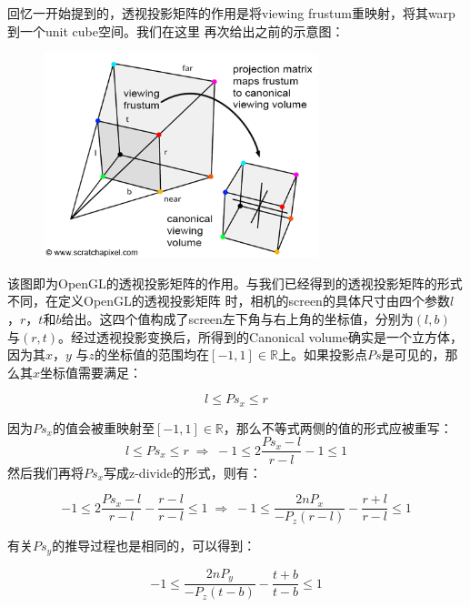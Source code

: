 \documentclass[12pt]{article}
\begin{document}
\indent{}回忆一开始提到的，透视投影矩阵的作用是将viewing frustum重映射，将其warp到一个unit cube空间。我们在这里
再次给出之前的示意图：

\begin{figure}[h]
\centering
\includegraphics[width=8cm]{./imgs/canonical1.png}
\end{figure}

\indent{}该图即为OpenGL的透视投影矩阵的作用。与我们已经得到的透视投影矩阵的形式不同，在定义OpenGL的透视投影矩阵
时，相机的screen的具体尺寸由四个参数$l$，$r$，$t$和$b$给出。这四个值构成了screen左下角与右上角的坐标值，分别为$(l,b)$
与$(r,t)$。经过透视投影变换后，所得到的Canonical volume确实是一个立方体，因为其$x$，$y$
与$z$的坐标值的范围均在$[-1,1]\in\mathbb{R}$上。如果投影点$Ps$是可见的，那么其$x$坐标值需要满足：

\begin{displaymath}
l \leqslant Ps_x \leqslant r
\end{displaymath}

\noindent{}因为$Ps_x$的值会被重映射至$[-1,1]\in\mathbb{R}$，那么不等式两侧的值的形式应被重写：
\begin{displaymath}
l \leqslant Ps_x \leqslant r \;\Rightarrow\; -1 \leqslant 2\frac{Ps_x-l}{r-l}-1 \leqslant 1
\end{displaymath}
\noindent{}然后我们再将$Ps_x$写成z-divide的形式，则有：

\begin{displaymath}
-1 \leqslant 2\frac{Ps_x-l}{r-l}-\frac{r-l}{r-l} \leqslant 1 \;\Rightarrow\;
-1 \leqslant \frac{2nP_x}{-P_z (r-l)} - \frac{r+l}{r-l} \leqslant 1
\end{displaymath}

\noindent{}有关$Ps_y$的推导过程也是相同的，可以得到：

\begin{displaymath}
-1 \leqslant \frac{2nP_y}{-P_z(t-b)} - \frac{t+b}{t-b} \leqslant 1
\end{displaymath}
\end{document}
